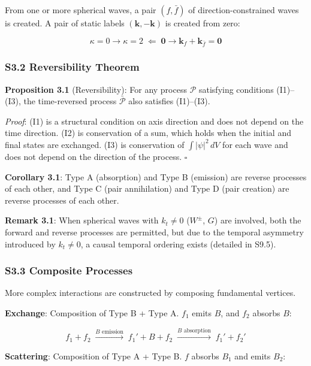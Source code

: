 \documentclass[
  a4paper,11pt]{article}
\theoremstyle{definition}
\theoremstyle{remark}
\begin{document}
From one or more spherical waves, a pair \((f, \bar{f})\) of
direction-constrained waves is created. A pair of static labels
\((\mathbf{k}, -\mathbf{k})\) is created from zero:

\[\kappa = 0 \to \kappa = 2 \;\Longleftarrow\; \mathbf{0} \to \mathbf{k}_f + \mathbf{k}_{\bar{f}} = \mathbf{0}\]

\subsubsection{S3.2 Reversibility
Theorem}\label{s3.2-reversibility-theorem}

\textbf{Proposition 3.1} (Reversibility): For any process
\(\mathcal{P}\) satisfying conditions (I1)--(I3), the time-reversed
process \(\bar{\mathcal{P}}\) also satisfies (I1)--(I3).

\emph{Proof}: (I1) is a structural condition on axis direction and does
not depend on the time direction. (I2) is conservation of a sum, which
holds when the initial and final states are exchanged. (I3) is
conservation of \(\int |\psi|^2 \, dV\) for each wave and does not
depend on the direction of the process. \(\square\)

\textbf{Corollary 3.1}: Type A (absorption) and Type B (emission) are
reverse processes of each other, and Type C (pair annihilation) and Type
D (pair creation) are reverse processes of each other.

\textbf{Remark 3.1}: When spherical waves with \(k_t \neq 0\)
(\(W^{\pm}\), \(G\)) are involved, both the forward and reverse
processes are permitted, but due to the temporal asymmetry introduced by
\(k_t \neq 0\), a causal temporal ordering exists (detailed in S9.5).

\subsubsection{S3.3 Composite Processes}\label{s3.3-composite-processes}

More complex interactions are constructed by composing fundamental
vertices.

\textbf{Exchange}: Composition of Type B + Type A. \(f_1\) emits \(B\),
and \(f_2\) absorbs \(B\):

\[f_1 + f_2 \;\xrightarrow{B\text{ emission}}\; f_1' + B + f_2 \;\xrightarrow{B\text{ absorption}}\; f_1' + f_2'\]

\textbf{Scattering}: Composition of Type A + Type B. \(f\) absorbs
\(B_1\) and emits \(B_2\):
\end{document}
